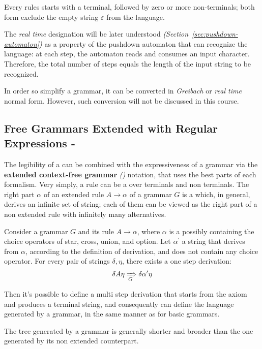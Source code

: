 \documentclass[english]{article}
\begin{document}
Every rules starts with a terminal, followed by zero or more non-terminals;
both form exclude the empty string \(\varepsilon\) from the language.

The \textit{real time} designation will be later understood \textit{(Section~\ref{sec:pushdown-automaton})} as a property of the pushdown automaton that can recognize the language:
at each step, the automaton reads and consumes an input character.
Therefore, the total number of steps equals the length of the input string to be recognized.

In order so simplify a grammar, it can be converted in \textit{Greibach} or \textit{real time} normal form.
However, such conversion will not be discussed in this course.

\subsection{Free Grammars Extended with Regular Expressions - \EBNF}
\label{sec:free-grammars-extended-with-regular-expressions}

The legibility of a \re can be combined with the expressiveness of a grammar via the \textbf{extended context-free grammar} \textit{(\EBNF)} notation, that uses the best parts of each formalism.
Very simply, a rule \RP can be a \re over terminals and non terminals.
The right part \(\alpha\) of an extended rule \(A \rightarrow \alpha\) of a grammar \(G\) is a \re which, in general, derives an infinite set of string;
each of them can be viewed as the right part of a non extended rule with infinitely many alternatives.

Consider a grammar \(G\) and its rule \(A \rightarrow \alpha\), where \(\alpha\) is a \re possibly containing the choice operators of star, cross, union, and option.
Let \(\alpha^\prime\) a string that derives from \(\alpha\), according to the definition of \re derivation, and does not contain any choice operator.
For every pair of strings \(\delta, \eta\), there exists a one step derivation:
\[ \delta A \eta \xRightarrow[G]{} \delta \alpha^\prime \eta \]

Then it's possible to define a multi step derivation that starts from the axiom and produces a terminal string, and consequently can define the language generated by a \EBNF grammar, in the same manner as for basic grammars.

The tree generated by a \EBNF grammar is generally shorter and broader than the one generated by its non extended counterpart.
\end{document}
